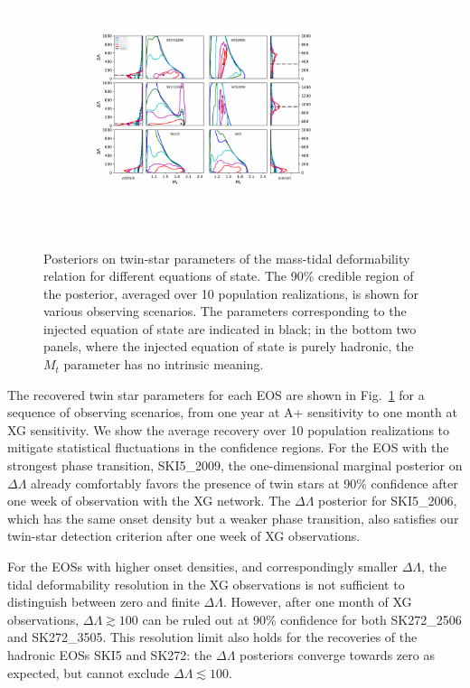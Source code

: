 \documentclass[aps,prl,twocolumn,superscriptaddress,footinbib]{revtex4-1}
\begin{document}
\begin{figure}[t]
    \centering
    \includegraphics[width=0.83\textwidth,trim={145 168 135 74},clip]{unif-moneyplot.pdf}
    \caption{Posteriors on twin-star parameters of the mass-tidal deformability relation for different equations of state. The 90\% credible region of the posterior, averaged over 10 population realizations, is shown for various observing scenarios. The parameters corresponding to the injected equation of state are indicated in black; in the bottom two panels, where the injected equation of state is purely hadronic, the $M_t$ parameter has no intrinsic meaning.}
    \label{fig:results}
\end{figure}

The recovered twin star parameters for each EOS are shown in Fig.~\ref{fig:results} for a sequence of observing scenarios, from one year at A+ sensitivity to one month at XG sensitivity. We show the average recovery over 10 population realizations to mitigate statistical fluctuations in the confidence regions. 
For the EOS with the strongest phase transition, SKI5\_2009, the one-dimensional marginal posterior on $\Delta\Lambda$ already comfortably favors the presence of twin stars at 90\% confidence after one week of observation with the XG network. The $\Delta\Lambda$ posterior for SKI5\_2006, which has the same onset density but a weaker phase transition, also satisfies our twin-star detection criterion after one week of XG observations.

For the EOSs with higher onset densities, and correspondingly smaller $\Delta\Lambda$, the tidal deformability resolution in the XG observations is not sufficient to distinguish between zero and finite $\Delta\Lambda$. However, after one month of XG observations, $\Delta\Lambda \gtrsim 100$ can be ruled out at 90\% confidence for both SK272\_2506 and SK272\_3505. This resolution limit also holds for the recoveries of the hadronic EOSs SKI5 and SK272: the $\Delta\Lambda$ posteriors converge towards zero as expected, but cannot exclude $\Delta\Lambda \lesssim 100$.
\end{document}
